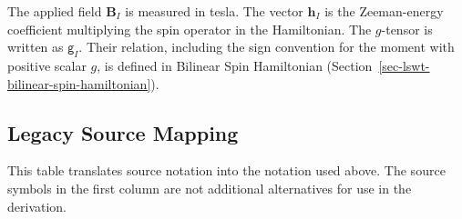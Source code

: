 The applied field \(\mathbf B_I\) is measured in tesla. The vector \(\mathbf h_I\) is the Zeeman-energy coefficient multiplying the spin operator in the Hamiltonian. The \(g\)-tensor is written as \(\mathsf g_I\). Their relation, including the sign convention for the moment with positive scalar \(g\), is defined in Bilinear Spin Hamiltonian (Section~\ref{sec-lswt-bilinear-spin-hamiltonian}).

\subsection{Legacy Source Mapping}

This table translates source notation into the notation used above. The source symbols in the first column are not additional alternatives for use in the derivation.

